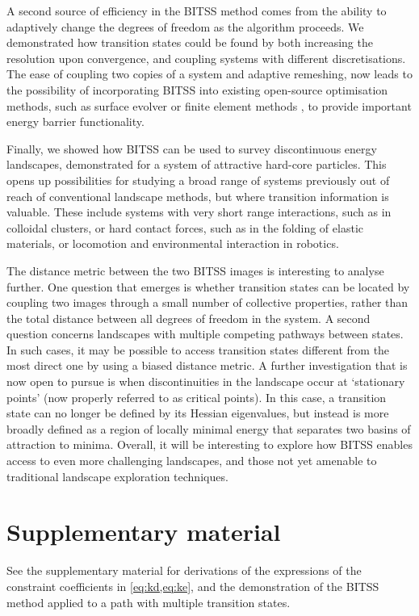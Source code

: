 \documentclass[aip,jcp,reprint,twocolumn]{revtex4-1}
\begin{document}
A second source of efficiency in the BITSS method comes from the ability to adaptively change the degrees of freedom as the algorithm proceeds.
We demonstrated how transition states could be found by both increasing the resolution upon convergence, and coupling systems with different discretisations.
The ease of coupling two copies of a system and adaptive remeshing, now leads to the possibility of incorporating BITSS into existing open-source optimisation methods, such as surface evolver \cite{Brakke1992} or finite element methods \cite{Kolev2021}, to provide important energy barrier functionality.

Finally, we showed how BITSS can be used to survey discontinuous energy landscapes, demonstrated for a system of attractive hard-core particles.
This opens up possibilities for studying a broad range of systems previously out of reach of conventional landscape methods, but where transition information is valuable.
These include systems with very short range interactions, such as in colloidal clusters, or hard contact forces, such as in the folding of elastic materials, or locomotion and environmental interaction in robotics.

The distance metric between the two BITSS images is interesting to analyse further.
One question that emerges is whether transition states can be located by coupling two images through a small number of collective properties, rather than the total distance between all degrees of freedom in the system.
A second question concerns landscapes with multiple competing pathways between states.
In such cases, it may be possible to access transition states different from the most direct one by using a biased distance metric.
A further investigation that is now open to pursue is when discontinuities in the landscape occur at `stationary points' (now properly referred to as critical points).
In this case, a transition state can no longer be defined by its Hessian eigenvalues, but instead is more broadly defined as a region of locally minimal energy that separates two basins of attraction to minima.
Overall, it will be interesting to explore how BITSS enables access to even more challenging landscapes, and those not yet amenable to traditional landscape exploration techniques.


\section*{Supplementary material}
See the supplementary material for derivations of the expressions of the constraint coefficients in \cref{eq:kd,eq:ke}, and the demonstration of the BITSS method applied to a path with multiple transition states.
\end{document}
